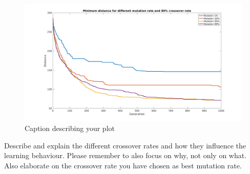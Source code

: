 \documentclass[a4paper, 12pt]{article}
\begin{document}
\begin{figure}[ht!]
  \centering
  \includegraphics[width=1.0\textwidth]{images/mutfig-mine}
    \caption{Caption describing your plot \label{fig:mutfig}}
\end{figure}

Describe and explain the different crossover rates and how they influence the learning behaviour. Please remember to also focus on why, not only on what.
Also elaborate on the crossover rate you have chosen as best mutation rate.
\end{document}
